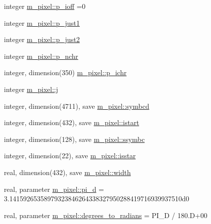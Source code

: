 \begin{DoxyCompactItemize}
\item 
integer \mbox{\hyperlink{namespacem__pixel_a7dfccfa543f53e4f6bd06a28f963ee69}{m\+\_\+pixel\+::p\+\_\+ioff}} =0
\item 
integer \mbox{\hyperlink{namespacem__pixel_aea6d1d5a4f88e0b07db43e92463bb065}{m\+\_\+pixel\+::p\+\_\+just1}}
\item 
integer \mbox{\hyperlink{namespacem__pixel_a9d00991f1ff7ed891170100d8e9d64f0}{m\+\_\+pixel\+::p\+\_\+just2}}
\item 
integer \mbox{\hyperlink{namespacem__pixel_a70edd7b43b9667a9d304b3028f113cc8}{m\+\_\+pixel\+::p\+\_\+nchr}}
\item 
integer, dimension(350) \mbox{\hyperlink{namespacem__pixel_a34ef1aad7a3aa45df090b226788a2d2c}{m\+\_\+pixel\+::p\+\_\+ichr}}
\item 
integer \mbox{\hyperlink{namespacem__pixel_a1faa00d5ad36016f8c9f4522a2391209}{m\+\_\+pixel\+::j}}
\item 
integer, dimension(4711), save \mbox{\hyperlink{namespacem__pixel_a3da3613bd8dfa6a15b7d0aa3db1f9eb5}{m\+\_\+pixel\+::symbcd}}
\item 
integer, dimension(432), save \mbox{\hyperlink{namespacem__pixel_af41ef8a6b53ec63db42172fab83ecbfa}{m\+\_\+pixel\+::istart}}
\item 
integer, dimension(128), save \mbox{\hyperlink{namespacem__pixel_a2b75d036a498ac0c68380803a0f1d538}{m\+\_\+pixel\+::ssymbc}}
\item 
integer, dimension(22), save \mbox{\hyperlink{namespacem__pixel_a6f8d92e6b4c33e62399d3286448b76fa}{m\+\_\+pixel\+::isstar}}
\item 
real, dimension(432), save \mbox{\hyperlink{namespacem__pixel_abf266872f93a04af39d2903fb20d2a0d}{m\+\_\+pixel\+::width}}
\item 
real, parameter \mbox{\hyperlink{namespacem__pixel_a51ed97a239a2e633db7f4a5cf7e61006}{m\+\_\+pixel\+::pi\+\_\+d}} = 3.\+14159265358979323846264338327950288419716939937510d0
\item 
real, parameter \mbox{\hyperlink{namespacem__pixel_ae2cb6913bb1501cb9872cb874a6c283e}{m\+\_\+pixel\+::degrees\+\_\+to\+\_\+radians}} = P\+I\+\_\+D / 180.\+D+00
\end{DoxyCompactItemize}
